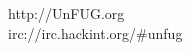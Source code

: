 \documentclass[
    headinclude=false,
    footinclude=false,
    paper=A3,
    paper=portrait,
    pagesize
]{scrartcl}
\begin{document}
    \vfill{}

    \begin{mdframed}[style=mdunfugblank]
        \begin{center}
            \begin{huge}
                http://UnFUG.org \\
                irc://irc.hackint.org/#unfug
            \end{huge}
        \end{center}
    \end{mdframed}
\end{document}
